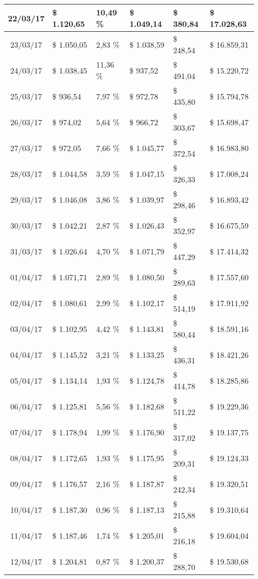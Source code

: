 \begin{small}
\begin{longtable}{|c|l|l|l|l|l|}
22/03/17 & \$ 1.120,65 & 10,49 \% & \$ 1.049,14 & \$ 380,84 & \$ 17.028,63 \\ \hline
23/03/17 & \$ 1.050,05 & 2,83 \% & \$ 1.038,59 & \$ 248,54 & \$ 16.859,31 \\ \hline
24/03/17 & \$ 1.038,45 & 11,36 \% & \$ 937,52 & \$ 491,04 & \$ 15.220,72 \\ \hline
25/03/17 & \$ 936,54 & 7,97 \% & \$ 972,78 & \$ 435,80 & \$ 15.794,78 \\ \hline
26/03/17 & \$ 974,02 & 5,64 \% & \$ 966,72 & \$ 303,67 & \$ 15.698,47 \\ \hline
27/03/17 & \$ 972,05 & 7,66 \% & \$ 1.045,77 & \$ 372,54 & \$ 16.983,80 \\ \hline
28/03/17 & \$ 1.044,58 & 3,59 \% & \$ 1.047,15 & \$ 326,33 & \$ 17.008,24 \\ \hline
29/03/17 & \$ 1.046,08 & 3,86 \% & \$ 1.039,97 & \$ 298,46 & \$ 16.893,42 \\ \hline
30/03/17 & \$ 1.042,21 & 2,87 \% & \$ 1.026,43 & \$ 352,97 & \$ 16.675,59 \\ \hline
31/03/17 & \$ 1.026,64 & 4,70 \% & \$ 1.071,79 & \$ 447,29 & \$ 17.414,32 \\ \hline
01/04/17 & \$ 1.071,71 & 2,89 \% & \$ 1.080,50 & \$ 289,63 & \$ 17.557,60 \\ \hline
02/04/17 & \$ 1.080,61 & 2,99 \% & \$ 1.102,17 & \$ 514,19 & \$ 17.911,92 \\ \hline
03/04/17 & \$ 1.102,95 & 4,42 \% & \$ 1.143,81 & \$ 580,44 & \$ 18.591,16 \\ \hline
04/04/17 & \$ 1.145,52 & 3,21 \% & \$ 1.133,25 & \$ 436,31 & \$ 18.421,26 \\ \hline
05/04/17 & \$ 1.134,14 & 1,93 \% & \$ 1.124,78 & \$ 414,78 & \$ 18.285,86 \\ \hline
06/04/17 & \$ 1.125,81 & 5,56 \% & \$ 1.182,68 & \$ 511,22 & \$ 19.229,36 \\ \hline
07/04/17 & \$ 1.178,94 & 1,99 \% & \$ 1.176,90 & \$ 317,02 & \$ 19.137,75 \\ \hline
08/04/17 & \$ 1.172,65 & 1,93 \% & \$ 1.175,95 & \$ 209,31 & \$ 19.124,33 \\ \hline
09/04/17 & \$ 1.176,57 & 2,16 \% & \$ 1.187,87 & \$ 242,34 & \$ 19.320,51 \\ \hline
10/04/17 & \$ 1.187,30 & 0,96 \% & \$ 1.187,13 & \$ 215,88 & \$ 19.310,64 \\ \hline
11/04/17 & \$ 1.187,46 & 1,74 \% & \$ 1.205,01 & \$ 216,18 & \$ 19.604,04 \\ \hline
12/04/17 & \$ 1.204,81 & 0,87 \% & \$ 1.200,37 & \$ 288,70 & \$ 19.530,68 \\ \hline

\end{longtable}
\end{small}

